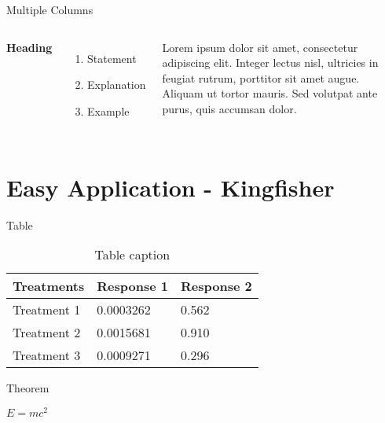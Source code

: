 \documentclass[aspectratio=169,xcolor=dvipsnames]{beamer}
\begin{document}
	\begin{frame}{Multiple Columns}
		\begin{columns}[c] %
			
			\textbf{Heading}
			\begin{enumerate}
				\item Statement
				\item Explanation
				\item Example
			\end{enumerate}
			
			Lorem ipsum dolor sit amet, consectetur adipiscing elit. Integer lectus nisl, ultricies in feugiat rutrum, porttitor sit amet augue. Aliquam ut tortor mauris. Sed volutpat ante purus, quis accumsan dolor.
			
		\end{columns}
	\end{frame}
	
	\section{Easy Application - Kingfisher}
	
	\begin{frame}{Table}
		\begin{table}
			\begin{tabular}{l l l}
				\toprule
				\textbf{Treatments} & \textbf{Response 1} & \textbf{Response 2} \\
				\midrule
				Treatment 1         & 0.0003262           & 0.562               \\
				Treatment 2         & 0.0015681           & 0.910               \\
				Treatment 3         & 0.0009271           & 0.296               \\
				\bottomrule
			\end{tabular}
			\caption{Table caption}
		\end{table}
	\end{frame}
	
	
	\begin{frame}{Theorem}
		\begin{theorem}
			$E = mc^2$
		\end{theorem}
	\end{frame}
	
\end{document}
